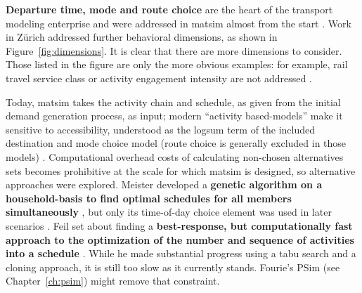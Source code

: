 
\textbf{Departure time, mode and route choice} are the heart of the transport modeling enterprise and were addressed in \gls{matsim} almost from the start \citep{RaneyNagel2004agdb,BalmerRaneyEtAl2005act-times,RieserGretherNagel2008modeChoiceCalculations}.
%
Work in Zürich addressed further behavioral dimensions, 
as shown in Figure~\ref{fig:dimensions}.
It is clear that there are more dimensions to consider. Those listed in the figure are only the more obvious examples: for example, rail travel service class or activity engagement intensity are not addressed . 

Today, \gls{matsim} takes the activity chain and schedule, as given from the initial demand generation process, as input; modern ``activity based-models'' make it sensitive to accessibility, understood as the logsum term of the included destination and mode choice model (route choice is generally excluded in those models) \citep[see][for an early example]{BenAkivaEtAl_Transportation_1996}.
Computational overhead costs of calculating non-chosen alternatives sets becomes prohibitive at the scale for which \gls{matsim} is designed,
 so alternative approaches were explored. 
%
Meister developed a \textbf{genetic algorithm on a household-basis to find optimal schedules for all members simultaneously} \citep[reported in][]{MeisterEtAl_Transportation_2005},
but only its time-of-day choice element was used in later scenarios \citep{MeisterBalmerEtc2006planomatIatbr}.
%
Feil set about finding a \textbf{best-response, but computationally fast approach to the optimization of the number and sequence of activities into a schedule} \citep[][]{Feil_PhDThesis_2010}. While he made substantial progress using a tabu search and a cloning approach, it is still too slow as it currently stands. Fourie's PSim (see Chapter~\ref{ch:psim}) might remove that constraint.

